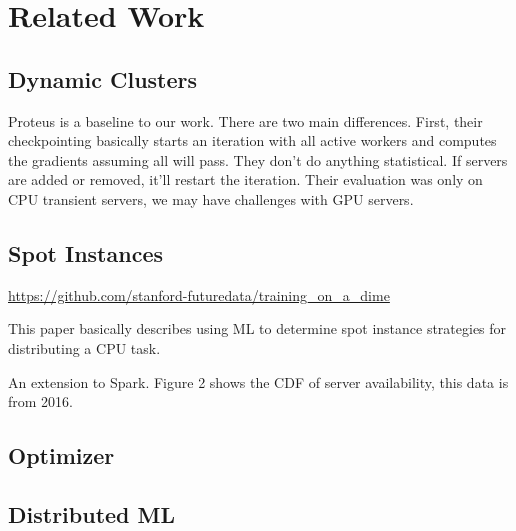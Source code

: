 \chapter{Related Work}
\label{ch:related work}

\section{Dynamic Clusters}


Proteus is a baseline to our work.
There are two main differences.
First, their checkpointing basically starts an iteration with all active workers
and computes the gradients assuming all will pass.
They don't do anything statistical.
If servers are added or removed, it'll restart the iteration.
Their evaluation was only on CPU transient servers, we may have challenges with
GPU servers.

\section{Spot Instances}


\url{https://github.com/stanford-futuredata/training_on_a_dime}



This paper basically describes using ML to determine spot instance strategies
for distributing a CPU task.


An extension to Spark.
Figure 2 shows the CDF of server availability, this data is from 2016.

\section{Optimizer}


\section{Distributed ML}



